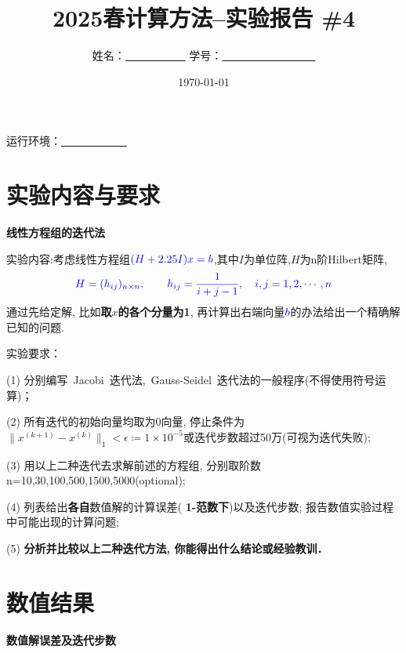 \documentclass[UTF8]{ctexart}
\title{\textbf {2025春计算方法--实验报告 \#4}}
\author{姓名：\underline{~~~~~~~~~~~}  学号：\underline{~~~~~~~~~~~~~~~~~} }
\date{\today}
\begin{document}
\maketitle

运行环境：\underline{~~~~~~~~~~~~}

\section*{实验内容与要求}
    \textbf{线性方程组的迭代法}


    {\color{blue} 实验内容}:考虑线性方程组$\color{blue}{(H + 2.25 I )x = b}$,其中$I$为单位阵,$H$为n阶{\color{blue}Hilbert矩阵},
    \[\color{blue}{H=(h_{ij})_{n\times n}, \qquad  h_{ij}=\frac{1}{i+j-1},\quad i,j=1,2,\cdots,n}\]
    通过先给{\color{blue}定解}, 比如{\color{red}\textbf{取$x$的各个分量为1}}, 再计算出右端向量$\color{blue}b$的办法给出一个精确解已知的问题.

    {\color{blue} 实验要求}：

    (1) 分别编写~Jacobi~迭代法,~Gauss-Seidel~迭代法的一般程序({\color{red}不得使用符号运算})；

    (2) 所有迭代的{\color{red}初始向量均取为$0$向量, 停止条件为$\|x^{(k+1)}-x^{(k)}\|_1<\epsilon \coloneqq 1\times 10^{-5}$或迭代步数超过50万(可视为迭代失败)};

    (3) 用以上二种迭代去求解前述的方程组,
    分别取阶数~{\color{red} n=10,30,100,500,1500,5000(optional)};

    (4) 列表给出\textbf{各自}{\color{blue}数值解}的计算误差(\textbf{\color{red} 1-范数下})以及{\color{blue}迭代步数}; 报告数值实验过程中可能出现的计算问题;

    (5) \textbf{分析并比较以上二种迭代方法, 你能得出什么结论或经验教训．}
    \clearpage


\section{数值结果}

    \textbf {数值解误差及迭代步数}
\end{document}
